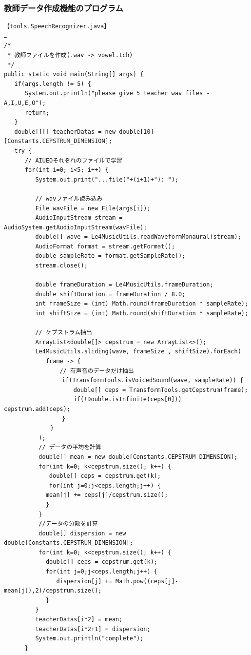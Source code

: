 \documentclass[a4j]{jarticle}
\begin{document}
\subsubsection{教師データ作成機能のプログラム}
\begin{verbatim}
【tools.SpeechRecognizer.java】
…
/*
 * 教師ファイルを作成(.wav -> vowel.tch)
 */
public static void main(String[] args) {
   if(args.length != 5) {
      System.out.println("please give 5 teacher wav files - A,I,U,E,O");
      return;
   }
   double[][] teacherDatas = new double[10][Constants.CEPSTRUM_DIMENSION];
   try {
      // AIUEOそれぞれのファイルで学習
      for(int i=0; i<5; i++) {
         System.out.print("...file("+(i+1)+"): ");
         
         // wavファイル読み込み
         File wavFile = new File(args[i]);
         AudioInputStream stream = AudioSystem.getAudioInputStream(wavFile);
         double[] wave = Le4MusicUtils.readWaveformMonaural(stream);
         AudioFormat format = stream.getFormat();
         double sampleRate = format.getSampleRate();
         stream.close();
			
         double frameDuration = Le4MusicUtils.frameDuration;
         double shiftDuration = frameDuration / 8.0;
         int frameSize = (int) Math.round(frameDuration * sampleRate);
         int shiftSize = (int) Math.round(shiftDuration * sampleRate);
			
         // ケプストラム抽出
         ArrayList<double[]> cepstrum = new ArrayList<>();
         Le4MusicUtils.sliding(wave, frameSize , shiftSize).forEach(
            frame -> {
           　　　// 有声音のデータだけ抽出
　　　　　　　　　　if(TransformTools.isVoicedSound(wave, sampleRate)) {
　　　　　　　　　　　　double[] ceps = TransformTools.getCepstrum(frame);
　　　　　　　　　　　　if(!Double.isInfinite(ceps[0])) cepstrum.add(ceps);
　　　　　　　　　　}
　　　　　　　　}
　　　　　　);
　　　　　　// データの平均を計算
　　　　　　double[] mean = new double[Constants.CEPSTRUM_DIMENSION];
　　　　　　for(int k=0; k<cepstrum.size(); k++) {
　　　　　　   double[] ceps = cepstrum.get(k);
　　　　　　   for(int j=0;j<ceps.length;j++) {
            mean[j] += ceps[j]/cepstrum.size();
            }
　　　　　　}			
　　　　　　//データの分散を計算
　　　　　　double[] dispersion = new double[Constants.CEPSTRUM_DIMENSION];
　　　　　　for(int k=0; k<cepstrum.size(); k++) {
            double[] ceps = cepstrum.get(k);
            for(int j=0;j<ceps.length;j++) {
               dispersion[j] += Math.pow((ceps[j]-mean[j]),2)/cepstrum.size();
            }
         }
         teacherDatas[i*2] = mean;
         teacherDatas[i*2+1] = dispersion;
         System.out.println("complete");
      }
			

\end{verbatim}
\end{document}
